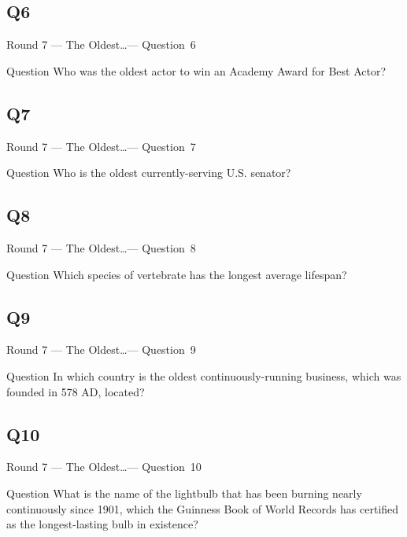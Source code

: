 \documentclass[11pt]{beamer}
\begin{document}
\subsection*{Q6}
\begin{frame}[t]{Round 7 --- The Oldest\ldots --- \mbox{Question 6}}
\vspace{-0.5em}
\begin{block}{Question}
Who was the oldest actor to win an Academy Award for Best Actor?
\end{block}
\end{frame}
\subsection*{Q7}
\begin{frame}[t]{Round 7 --- The Oldest\ldots --- \mbox{Question 7}}
\vspace{-0.5em}
\begin{block}{Question}
Who is the oldest currently-serving U.S. senator?
\end{block}
\end{frame}
\subsection*{Q8}
\begin{frame}[t]{Round 7 --- The Oldest\ldots --- \mbox{Question 8}}
\vspace{-0.5em}
\begin{block}{Question}
Which species of vertebrate has the longest average lifespan?
\end{block}
\end{frame}
\subsection*{Q9}
\begin{frame}[t]{Round 7 --- The Oldest\ldots --- \mbox{Question 9}}
\vspace{-0.5em}
\begin{block}{Question}
In which country is the oldest continuously-running business, which was founded in 578 AD, located?
\end{block}
\end{frame}
\subsection*{Q10}
\begin{frame}[t]{Round 7 --- The Oldest\ldots --- \mbox{Question 10}}
\vspace{-0.5em}
\begin{block}{Question}
What is the name of the lightbulb that has been burning nearly continuously since 1901, which the Guinness Book of World Records has certified as the longest-lasting bulb in existence?
\end{block}
\end{frame}
\end{document}
